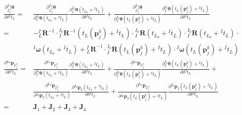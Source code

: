 \begin{equation}
  \begin{aligned}
    \frac{\partial {^{L_0}_{L_j^k}\boldsymbol{\theta}}}{\partial \delta{^{I}t_{L}}}= &
    \frac{\partial {^{L_0}_{L_j^k}\boldsymbol{\theta}}}{\partial {{^{I_0}_{I}}\boldsymbol{\theta}\left( t_{L_0}+{^{I}t_L}\right) }}
    \frac{\partial {{^{I_0}_{I}}\boldsymbol{\theta}\left( t_{L_0}+{^{I}t_L}\right) }}{\partial \delta {^{I}t_{L}}}
    +
    \frac{\partial {^{L_0}_{L_j^k}\boldsymbol{\theta}}}{\partial {{^{I_0}_{I}}\boldsymbol{\theta}\left( t_{L}(\boldsymbol{p}_j^k)+{^{I}t_L}\right) }}
    \frac{\partial {{^{I_0}_{I}}\boldsymbol{\theta}\left( t_{L}(\boldsymbol{p}_j^k)+{^{I}t_L}\right) }}{\partial \delta {^{I}t_{L}}}
    \\
    =                                                                                & -{{^{I}_{L}}\boldsymbol{R}^{-1}}\cdot{{^{I_0}_{I}}\boldsymbol{R}^{-1}\left( t_{L}(\boldsymbol{p}_j^k)+{^{I}t_L}\right) }
    \cdot{{^{I_0}_{I}}\boldsymbol{R}\left( t_{L_0}+{^{I}t_L}\right) }
    \cdot{{^{I_0}_{I}}\boldsymbol{R}\left( t_{L_0}+{^{I}t_L}\right) }
    \cdot                                                                                                                                                                                                       \\&{^{I}\boldsymbol{\omega}}\left( t_{L_0}+{^{I}t_L}\right)
    +{{^{I}_{L}}\boldsymbol{R}}^{-1}
    \cdot{{^{I_0}_{I}}\boldsymbol{R}\left( t_{L}(\boldsymbol{p}_j^k)+{^{I}t_L}\right) }
    \cdot{^{I}\boldsymbol{\omega}}\left( t_{L}(\boldsymbol{p}_j^k)+{^{I}t_L}\right)
    \\
    \frac{\partial {^{L_0}\boldsymbol{p}_{L_j^k}}}{\partial \delta {^{I}t_{L}}}=     &
    \frac{\partial {^{L_0}\boldsymbol{p}_{L_j^k}}}{\partial {{^{I_0}_{I}}\boldsymbol{\theta}\left( t_{L_0}+{^{I}t_L}\right) }}
    \frac{\partial {{^{I_0}_{I}}\boldsymbol{\theta}\left( t_{L_0}+{^{I}t_L}\right) }}{\partial \delta {^{I}t_{L}}}
    +
    \frac{\partial {^{L_0}\boldsymbol{p}_{L_j^k}}}{\partial {{^{I_0}_{I}}\boldsymbol{\theta}\left( t_{L}(\boldsymbol{p}_j^k)+{^{I}t_L}\right) }}
    \frac{\partial {{^{I_0}_{I}}\boldsymbol{\theta}\left( t_{L}(\boldsymbol{p}_j^k)+{^{I}t_L}\right) }}{\partial \delta {^{I}t_{L}}}
    +\\&
    \frac{\partial {^{L_0}\boldsymbol{p}_{L_j^k}}}{\partial {{^{I_0}}\boldsymbol{p}_{I}\left( t_{L_0}+{^{I}t_L}\right) }}
    \frac{\partial {{^{I_0}}\boldsymbol{p}_{I}\left( t_{L_0}+{^{I}t_L}\right) }}{\partial \delta {^{I}t_{L}}}
    +
    \frac{\partial {^{L_0}\boldsymbol{p}_{L_j^k}}}{\partial {{^{I_0}}\boldsymbol{p}_{I}\left( t_{L}(\boldsymbol{p}_j^k)+{^{I}t_L}\right) }}
    \frac{\partial {{^{I_0}}\boldsymbol{p}_{I}\left( t_{L}(\boldsymbol{p}_j^k)+{^{I}t_L}\right) }}{\partial \delta {^{I}t_{L}}}
    \\
    =                                                                                & \boldsymbol{J}_1+\boldsymbol{J}_2+\boldsymbol{J}_3+\boldsymbol{J}_4
  \end{aligned}
\end{equation}
